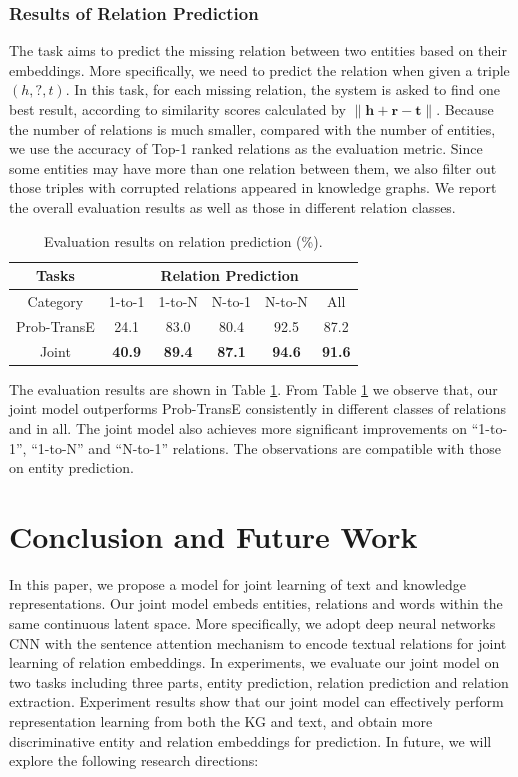 \documentclass[11pt,a4paper]{article}
\begin{document}
\subsubsection{Results of Relation Prediction}
The task aims to predict the missing relation between two entities based on their embeddings. More specifically, we need to predict the relation when given a triple $(h, ?, t)$. In this task, for each missing relation, the system is asked to find one best result, according to similarity scores calculated by $\lVert \textbf{h} + \textbf{r} - \textbf{t} \rVert$.
Because the number of relations is much smaller, compared with the number of entities, we use the accuracy of Top-1 ranked relations as the evaluation metric. Since some entities may have more than one relation between them, we also filter out those triples with corrupted relations appeared in knowledge graphs. We report the overall evaluation results as well as those in different relation classes.

\begin{table}[htb]
\centering
\small 
\begin{tabular}{|c|c|c|c|c|c|}
\hline
Tasks             & \multicolumn{5}{c|}{Relation Prediction}                      \\ \hline
Category & 1-to-1     & 1-to-N     & N-to-1     & N-to-N     & All           \\ \hline
Prob-TransE       & 24.1       & 83.0       & 80.4       & 92.5       & 87.2          \\ \hline
Joint             & \textbf{40.9} & \textbf{89.4} & \textbf{87.1} & \textbf{94.6} & \textbf{91.6} \\ \hline
\end{tabular}
\caption{Evaluation results on relation prediction (\%).}
\label{t:relation}
\end{table}

The evaluation results are shown in Table \ref{t:relation}. From Table \ref{t:relation} we observe that, our joint model outperforms Prob-TransE consistently in different classes of relations and in all. The joint model also achieves more significant improvements on ``1-to-1'', ``1-to-N'' and ``N-to-1'' relations. The observations are compatible with those on entity prediction.


\section{Conclusion and Future Work}

In this paper, we propose a model for joint learning of text and knowledge representations. Our joint model embeds entities, relations and words within the same continuous latent space. More specifically, we adopt deep neural networks CNN with the sentence attention mechanism to encode textual relations for joint learning of relation embeddings. In experiments, we evaluate our joint model on two tasks including three parts, entity prediction, relation prediction and relation extraction. Experiment results show that our joint model can effectively perform representation learning from both the KG and text, and obtain more discriminative entity and relation embeddings for prediction. In future, we will explore the following research directions: 
\end{document}
